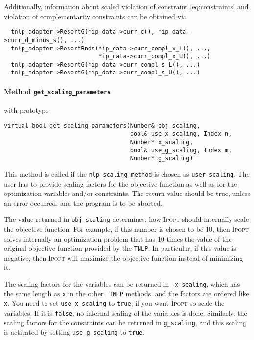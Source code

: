 \documentclass[10pt]{article}
\newcommand{\Ipopt}{\textsc{Ipopt}\xspace}
\begin{document}
Additionally, information about scaled violation of constraint 
\ref{eq:constraints} and violation of complementarity constraints can be 
obtained via
\begin{verbatim}
  tnlp_adapter->ResortG(*ip_data->curr_c(), *ip_data->curr_d_minus_s(), ...)
  tnlp_adapter->ResortBnds(*ip_data->curr_compl_x_L(), ...,
                           *ip_data->curr_compl_x_U(), ...)
  tnlp_adapter->ResortG(*ip_data->curr_compl_s_L(), ...)
  tnlp_adapter->ResortG(*ip_data->curr_compl_s_U(), ...)
\end{verbatim}

\paragraph{Method \texttt{get\_scaling\_parameters}} with prototype
\begin{verbatim}
virtual bool get_scaling_parameters(Number& obj_scaling,
                                    bool& use_x_scaling, Index n,
                                    Number* x_scaling,
                                    bool& use_g_scaling, Index m,
                                    Number* g_scaling)
\end{verbatim}

This method is called if the {\tt nlp\_scaling\_method} is chosen as
{\tt user-scaling}.  The user has to provide scaling factors for
the objective function as well as for the optimization variables
and/or constraints.  The return value should be true, unless an error
occurred, and the program is to be aborted.

The value returned in {\tt obj\_scaling} determines, how \Ipopt
should internally scale the objective function.  For example, if this
number is chosen to be 10, then \Ipopt solves internally an
optimization problem that has 10 times the value of the original
objective function provided by the {\tt TNLP}.  In particular, if this
value is negative, then \Ipopt will maximize the objective function
instead of minimizing it.

The scaling factors for the variables can be returned in {\tt
  x\_scaling}, which has the same length as {\tt x} in the other {\tt
  TNLP} methods, and the factors are ordered like {\tt x}.  You need
to set {\tt use\_x\_scaling} to {\tt true}, if you want \Ipopt so scale
the variables.  If it is {\tt false}, no internal scaling of the
variables is done.  Similarly, the scaling factors for the constraints
can be returned in {\tt g\_scaling}, and this scaling is activated by
setting {\tt use\_g\_scaling} to {\tt true}.
\end{document}
